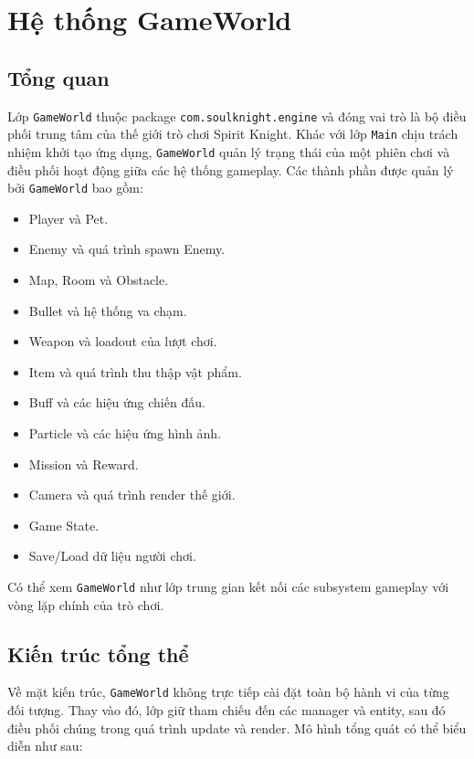 \documentclass[12pt,a4paper]{report}
\begin{document}
    \chapter{Hệ thống GameWorld}


    \section{Tổng quan}
    Lớp \texttt{GameWorld} thuộc package
    \texttt{com.soulknight.engine} và đóng vai trò là bộ điều phối
    trung tâm của thế giới trò chơi Spirit Knight.
    Khác với lớp \texttt{Main} chịu trách nhiệm khởi tạo ứng dụng,
    \texttt{GameWorld} quản lý trạng thái của một phiên chơi và
    điều phối hoạt động giữa các hệ thống gameplay.
    Các thành phần được quản lý bởi \texttt{GameWorld} bao gồm:
    \begin{itemize}
        \item Player và Pet.
        \item Enemy và quá trình spawn Enemy.
        \item Map, Room và Obstacle.
        \item Bullet và hệ thống va chạm.
        \item Weapon và loadout của lượt chơi.
        \item Item và quá trình thu thập vật phẩm.
        \item Buff và các hiệu ứng chiến đấu.
        \item Particle và các hiệu ứng hình ảnh.
        \item Mission và Reward.
        \item Camera và quá trình render thế giới.
        \item Game State.
        \item Save/Load dữ liệu người chơi.
    \end{itemize}
    Có thể xem \texttt{GameWorld} như lớp trung gian kết nối các
    subsystem gameplay với vòng lặp chính của trò chơi.


    \section{Kiến trúc tổng thể}
    Về mặt kiến trúc, \texttt{GameWorld} không trực tiếp cài đặt
    toàn bộ hành vi của từng đối tượng. Thay vào đó, lớp giữ tham
    chiếu đến các manager và entity, sau đó điều phối chúng trong
    quá trình update và render.
    Mô hình tổng quát có thể biểu diễn như sau:
\end{document}
